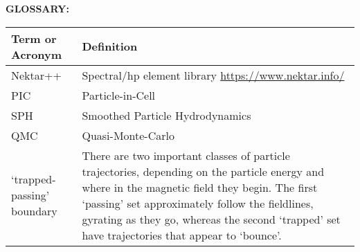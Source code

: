 \begin{table}[h]
\textbf{\textsf{GLOSSARY:}}
\begin{center}
\begin{tabular}{|p{4.0cm}|p{12.0cm}|}
\hline
\textbf{\textsf{Term or Acronym}}
& \textbf{\textsf{Definition}} \\
\hline
 Nektar++ & Spectral/hp element library \url{https://www.nektar.info/}\\
PIC & Particle-in-Cell \\
SPH & Smoothed Particle Hydrodynamics \\
QMC & Quasi-Monte-Carlo \\
\hline
`trapped-passing' boundary & There are two important classes of particle
trajectories, depending on the particle energy and where in the magnetic field they begin.
The first `passing' set approximately follow the fieldlines, gyrating as they go, whereas
the second `trapped' set have trajectories that appear to `bounce'. \\ 
\hline
\end{tabular}
\end{center}
\end{table}


